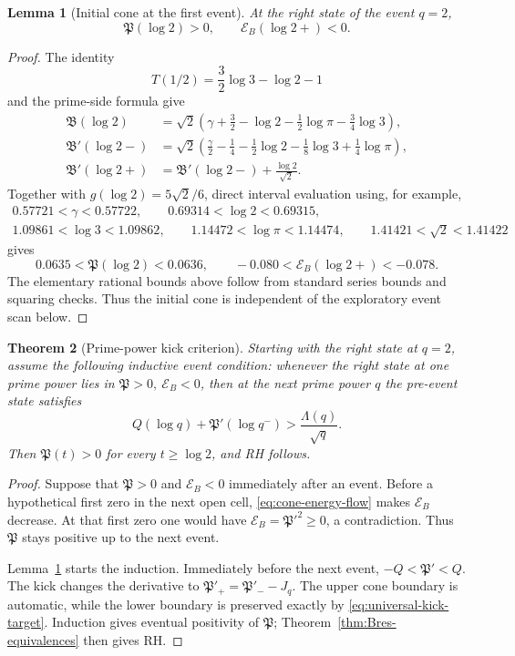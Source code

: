 \documentclass[11pt,a4paper]{article}
\numberwithin{equation}{section}
\newtheorem{theorem}{Theorem}
\newtheorem{lemma}[theorem]{Lemma}
\theoremstyle{definition}
\newcommand{\Bres}{\mathfrak B}
\begin{document}
\begin{lemma}[Initial cone at the first event]
\label{lem:initial-cone}
At the right state of the event \(q=2\),
\[
  \mathfrak P(\log2)>0,
  \qquad
  \mathcal E_B(\log2+)<0.
\]
\end{lemma}

\begin{proof}
The identity
\[
  T(1/2)=\frac32\log3-\log2-1
\]
and the prime-side formula give
\begin{align*}
  \Bres(\log2)
  & =\sqrt2\left(
    \gamma+\frac32-\log2-\frac12\log\pi-\frac34\log3
  \right),\\
  \Bres'(\log2-)
  & =\sqrt2\left(
    \frac\gamma2-\frac14-\frac12\log2-\frac18\log3
    +\frac14\log\pi
  \right),\\
  \Bres'(\log2+)
  & =\Bres'(\log2-)+\frac{\log2}{\sqrt2}.
\end{align*}
Together with \(g(\log2)=5\sqrt2/6\), direct interval evaluation using, for
example,
\[
\begin{gathered}
  0.57721<\gamma<0.57722,\qquad
  0.69314<\log2<0.69315,\\
  1.09861<\log3<1.09862,\qquad
  1.14472<\log\pi<1.14474,\qquad
  1.41421<\sqrt2<1.41422
\end{gathered}
\]
gives
\[
  0.0635<\mathfrak P(\log2)<0.0636,
  \qquad
  -0.080<\mathcal E_B(\log2+)<-0.078.
\]
The elementary rational bounds above follow from standard series bounds and
squaring checks.  Thus the initial cone is independent of the exploratory
event scan below.
\end{proof}

\begin{theorem}[Prime-power kick criterion]
\label{thm:kick-criterion}
Starting with the right state at \(q=2\), assume the following inductive event
condition: whenever the right state at one prime power lies in
\(\mathfrak P>0,\ \mathcal E_B<0\), then at the next prime power \(q\) the
pre-event state satisfies
\begin{equation}\label{eq:universal-kick-target}
  \boxed{
  Q(\log q)+\mathfrak P'(\log q^-)
  >\frac{\Lambda(q)}{\sqrt q}.
  }
\end{equation}
Then \(\mathfrak P(t)>0\) for every \(t\ge\log2\), and RH follows.
\end{theorem}

\begin{proof}
Suppose that \(\mathfrak P>0\) and \(\mathcal E_B<0\) immediately after an
event.  Before a hypothetical first zero in the next open cell,
\eqref{eq:cone-energy-flow} makes \(\mathcal E_B\) decrease.  At that first
zero one would have \(\mathcal E_B=\mathfrak P'^2\ge0\), a contradiction.
Thus \(\mathfrak P\) stays positive up to the next event.

Lemma~\ref{lem:initial-cone} starts the induction.  Immediately before the next
event, \(-Q<\mathfrak P'<Q\).  The kick changes the
derivative to \(\mathfrak P'_+=\mathfrak P'_- -J_q\).  The upper cone boundary
is automatic, while the lower boundary is preserved exactly by
\eqref{eq:universal-kick-target}.  Induction gives eventual positivity of
\(\mathfrak P\); Theorem~\ref{thm:Bres-equivalences} then gives RH.
\end{proof}
\end{document}
